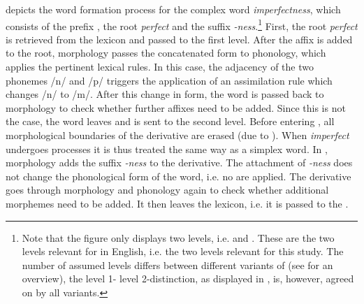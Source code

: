  depicts the word formation process for the complex word \textit{imperfectness}, which consists of the  prefix , the root \textit{perfect} and the  suffix \textit{-ness}.\footnote{Note that the figure only displays two levels, i.e.  and . These are the two levels relevant for  in English, i.e. the two levels relevant for this study. The number of assumed levels differs between different variants of  (see \citealt{Giegerich.1999} for an overview), the level 1- level 2-distinction, as displayed in , is, however, agreed on by all variants.}
First, the root \textit{perfect} is retrieved from the lexicon and passed to the first level. After the  affix  is added to the root,  morphology passes the concatenated form to  phonology, which applies the pertinent lexical rules. In this case, the adjacency of the two phonemes /n/ and /p/ triggers the application of an assimilation rule which changes /n/ to /m/. After this change in form, the word is passed back to  morphology to check whether further affixes need to be added. Since this is not the case, the word leaves  and is sent to the second level. 
Before entering , all morphological boundaries of the derivative are erased (due to ). When \textit{imperfect} undergoes  processes it is thus treated the same way as a simplex word.  
In ,  morphology adds the suffix \textit{-ness} to the derivative. The attachment of \textit{-ness} does not change the phonological form of the word, i.e. no  are applied. The derivative goes through  morphology and phonology again to check whether additional morphemes need to be added. It then leaves the lexicon, i.e. it is passed to the .\\

